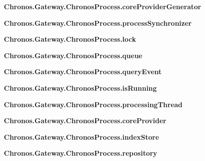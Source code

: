 \begin{DoxyCompactItemize}
\item 
{\bfseries Chronos.\+Gateway.\+Chronos\+Process.\+core\+Provider\+Generator}\hypertarget{group__Chronos_gade2eb18f4bf32a3cf1769816a8af6405}{}\label{group__Chronos_gade2eb18f4bf32a3cf1769816a8af6405}

\item 
{\bfseries Chronos.\+Gateway.\+Chronos\+Process.\+process\+Synchronizer}\hypertarget{group__Chronos_gadf2eb3a4a93458a680052cb13134a14e}{}\label{group__Chronos_gadf2eb3a4a93458a680052cb13134a14e}

\item 
{\bfseries Chronos.\+Gateway.\+Chronos\+Process.\+lock}\hypertarget{group__Chronos_ga50d76025b2bf8aff2e897377dfc49172}{}\label{group__Chronos_ga50d76025b2bf8aff2e897377dfc49172}

\item 
{\bfseries Chronos.\+Gateway.\+Chronos\+Process.\+queue}\hypertarget{group__Chronos_ga28a32c60aa5dd1e1a41078633641f0bf}{}\label{group__Chronos_ga28a32c60aa5dd1e1a41078633641f0bf}

\item 
{\bfseries Chronos.\+Gateway.\+Chronos\+Process.\+query\+Event}\hypertarget{group__Chronos_gacc2a41978431ae784c889c6dfd446d9e}{}\label{group__Chronos_gacc2a41978431ae784c889c6dfd446d9e}

\item 
{\bfseries Chronos.\+Gateway.\+Chronos\+Process.\+is\+Running}\hypertarget{group__Chronos_gaa2eb158c3b5025c732fc2884be3ef7d1}{}\label{group__Chronos_gaa2eb158c3b5025c732fc2884be3ef7d1}

\item 
{\bfseries Chronos.\+Gateway.\+Chronos\+Process.\+processing\+Thread}\hypertarget{group__Chronos_gae647c147a95c692351cea73c84937702}{}\label{group__Chronos_gae647c147a95c692351cea73c84937702}

\item 
{\bfseries Chronos.\+Gateway.\+Chronos\+Process.\+core\+Provider}\hypertarget{group__Chronos_gaf55123120e036fd5a96ef3858ddd083e}{}\label{group__Chronos_gaf55123120e036fd5a96ef3858ddd083e}

\item 
{\bfseries Chronos.\+Gateway.\+Chronos\+Process.\+index\+Store}\hypertarget{group__Chronos_ga1261efa506146e923fe56cd25ce05d15}{}\label{group__Chronos_ga1261efa506146e923fe56cd25ce05d15}

\item 
{\bfseries Chronos.\+Gateway.\+Chronos\+Process.\+repository}\hypertarget{group__Chronos_gabfa145bd9d4e2b1f06f5c23a89cc9fcc}{}\label{group__Chronos_gabfa145bd9d4e2b1f06f5c23a89cc9fcc}


\end{DoxyCompactItemize}
